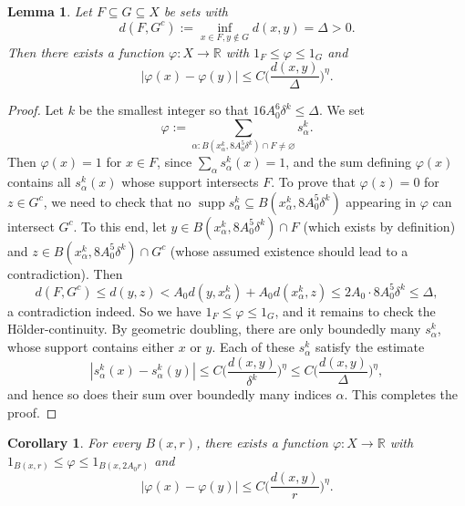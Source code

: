 \documentclass{amsart}
\numberwithin{equation}{section}
\theoremstyle{plain}
\newtheorem{corollary}[equation]{Corollary}
\newtheorem{lemma}[equation]{Lemma}
\theoremstyle{definition}
\theoremstyle{remark}
\begin{document}
{{\begin{lemma}\label{lem:existsLip}
Let $F\subseteq G\subseteq X$ be sets with
\begin{equation*}
  d(F,G^c):=\inf_{x\in F,y\notin G}d(x,y)=\Delta>0.
\end{equation*}
Then there exists a function $\varphi:X\to{\mathbb{R}}$ with $1_{F}\leq\varphi\leq 1_G$ and
\begin{equation*}
  {|{\varphi(x)-\varphi(y)}|}\leq C\Big(\frac{d(x,y)}{\Delta}\Big)^{\eta}.
\end{equation*}
\end{lemma}

\begin{proof}
Let $k$ be the smallest integer so that $16A_0^6\delta^k\leq\Delta$. We set
\begin{equation*}
  \varphi:=\sum_{\alpha:B(x^k_\alpha,8A_0^5\delta^k)\cap F\neq\varnothing}s^k_\alpha.
\end{equation*}
Then $\varphi(x)=1$ for $x\in F$, since $\sum_\alpha s^k_\alpha(x)=1$, and the sum defining $\varphi(x)$ contains all $s^k_\alpha(x)$ whose support intersects $F$. To prove that $\varphi(z)=0$ for $z\in G^c$, we need to check that no ${\operatorname{supp}} s^k_\alpha\subseteq B(x^k_\alpha,8A_0^5\delta^k)$ appearing in $\varphi$ can intersect $G^c$. To this end, let $y\in B(x^k_\alpha,8A_0^5\delta^k)\cap F$ (which exists by definition) and $z\in B(x^k_\alpha,8A_0^5\delta^k)\cap G^c$ (whose assumed existence should lead to a contradiction). Then
\begin{equation*}
  d(F,G^c)\leq d(y,z)< A_0 d(y,x^k_\alpha)+A_0 d(x^k_\alpha,z)\leq 2A_0\cdot 8 A_0^5\delta^k\leq\Delta,
\end{equation*}
a contradiction indeed. So we have $1_F\leq\varphi\leq 1_G$, and it remains to check the H\"older-continuity. By geometric doubling, there are only boundedly many $s^k_\alpha$, whose support contains either $x$ or $y$. Each of these $s^k_\alpha$ satisfy the estimate
\begin{equation*}
  {|{s^k_\alpha(x)-s^k_\alpha(y)}|}\leq C\Big(\frac{d(x,y)}{\delta^k}\Big)^{\eta}\leq C\Big(\frac{d(x,y)}{\Delta}\Big)^{\eta},
\end{equation*}
and hence so does their sum over boundedly many indices $\alpha$. This completes the proof.
\end{proof}

\begin{corollary}\label{cor:existBump}
For every $B(x,r)$, there exists a function $\varphi:X\to{\mathbb{R}}$ with $1_{B(x,r)}\leq\varphi\leq 1_{B(x,2A_0 r)}$ and
\begin{equation*}
    {|{\varphi(x)-\varphi(y)}|}\leq C\Big(\frac{d(x,y)}{r}\Big)^{\eta}.
\end{equation*}
\end{corollary}

}}
\end{document}
